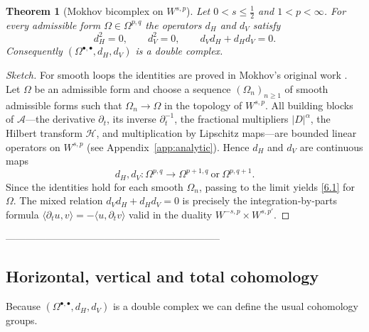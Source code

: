 \documentclass{amsart}
\newcounter{thm}
\newcounter{ex}
\newcounter{re}
\newtheorem{theorem}[thm]{Theorem}
\begin{document}
\begin{theorem}[Mokhov bicomplex on $W^{s,p}$]\label{th:bicomplex}
Let $0<s\le\tfrac12$ and $1<p<\infty$.  For every admissible form
$\Omega\in\Omega^{p,q}$ the operators $d_{H}$ and $d_{V}$ satisfy
\begin{equation}
d_{H}^{2}=0,\qquad d_{V}^{2}=0,\qquad d_{V}d_{H}+d_{H}d_{V}=0 .
\label{6.1}
\end{equation}
Consequently $(\Omega^{\bullet,\bullet},d_{H},d_{V})$ is a double complex.
\end{theorem}
\begin{proof}[Sketch]
For smooth loops the identities are proved in Mokhov’s original work
\cite{Mokhov1998,MokhovBook}.  Let $\Omega$ be an admissible form and choose a
sequence $(\Omega_{n})_{n\ge1}$ of smooth admissible forms such that
$\Omega_{n}\to\Omega$ in the topology of $W^{s,p}$.  All building blocks of
$\mathcal A$—the derivative $\partial_{t}$, its inverse $\partial_{t}^{-1}$,
the fractional multipliers $|D|^{\alpha}$, the Hilbert transform $\mathcal H$,
and multiplication by Lipschitz maps—are bounded linear operators on
$W^{s,p}$ (see Appendix~\ref{app:analytic}).  Hence $d_{H}$ and $d_{V}$ are
continuous maps
\[
d_{H},d_{V}:\Omega^{p,q}\longrightarrow\Omega^{p+1,q}\ \text{or}\ 
\Omega^{p,q+1}.
\]
Since the identities hold for each smooth $\Omega_{n}$, passing to the limit
yields \eqref{6.1} for $\Omega$.  The mixed relation $d_{V}d_{H}+d_{H}d_{V}=0$
is precisely the integration‑by‑parts formula
\(\langle\partial_{t}u,v\rangle=-\langle u,\partial_{t}v\rangle\)
valid in the duality $W^{-s,p}\times W^{s,p'}$.
\end{proof}

-----------------------------------------------------------------
\subsection{Horizontal, vertical and total cohomology}
\label{subsec:cohomology}
Because $(\Omega^{\bullet,\bullet},d_{H},d_{V})$ is a double complex we can
define the usual cohomology groups.
\end{document}
